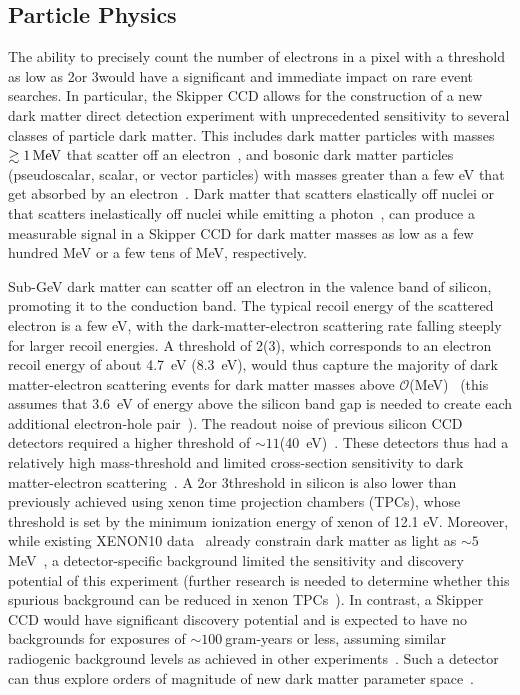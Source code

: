 \documentclass[aps,prl,reprint,superscriptaddress,floatfix,nofootinbib,showkeys,showpacs,preprintnumbers]{revtex4-1}
\begin{document}
\subsection{Particle Physics}

The ability to precisely count the number of electrons in a pixel with a threshold as low as 2\e or 3\e  would have a significant and immediate impact on rare event searches. 
In particular, the Skipper CCD allows for the construction of a new dark matter direct detection experiment with unprecedented sensitivity to several classes of particle dark matter.  
This includes dark matter particles with masses $\gtrsim 1 \mathrm{\,MeV}$ that scatter off an  electron~\cite{Essig:2011nj,Graham:2012su,Lee:2015qva,Essig:2015cda}, and bosonic dark matter particles (pseudoscalar, scalar, or vector particles) with masses greater than a few eV that get absorbed by an electron~\cite{An:2013yua,An:2014twa,Bloch:2016sjj,Hochberg:2016sqx}. 
Dark matter that scatters elastically off nuclei or that scatters inelastically 
off nuclei while emitting a photon~\cite{Kouvaris:2016afs}, can produce a measurable 
signal in a Skipper CCD for dark matter masses as low as a few hundred MeV  or 
a few tens of MeV, respectively.  

Sub-GeV dark matter can scatter off an electron in the valence band of silicon,
promoting it to the conduction band. 
The typical recoil energy of the scattered electron is a few eV, with the dark-matter-electron scattering rate falling steeply for larger recoil energies. A threshold of 2\e (3\e), which corresponds to an electron recoil energy of about 4.7~eV (8.3~eV), would thus capture the majority of dark matter-electron scattering events for dark matter masses above $\mathcal{O}$(MeV)~\cite{Essig:2015cda} (this assumes that 3.6~eV of energy above the silicon band gap is needed to create each additional electron-hole pair~\cite{Klein:1968,ExptGaps}).   
The readout noise of previous silicon CCD detectors required a higher threshold of $\sim 11$\e (40~eV)~\cite{Barreto:2011zu}.
These detectors thus had a relatively high mass-threshold and limited cross-section sensitivity to dark matter-electron scattering~\cite{Essig:2015cda}.  
A 2\e or 3\e threshold in silicon is also lower than previously achieved using xenon time projection chambers (TPCs), whose threshold is set by the minimum ionization energy of xenon of 12.1 eV. 
Moreover, while existing XENON10 data~\cite{Angle:2011th} already constrain dark matter as light as $\sim 5\ $MeV~\cite{Essig:2012yx,Essig:2017kqs}, a detector-specific background limited the sensitivity and discovery potential of this experiment (further research is needed to determine whether this spurious background can be reduced in xenon TPCs~\cite{Sorensen:2017ymt}). 
In contrast, a Skipper CCD  
would have significant discovery potential and is expected to have no backgrounds for exposures of $\sim 100\ $gram-years or less, assuming similar radiogenic background levels as achieved in other experiments~\cite{Agnese:2015nto,Aalseth:2012if,Abgrall:2016tnn,Armengaud:2016aoz}. 
Such a detector can thus explore orders of magnitude of new dark matter parameter space~\cite{Essig:2015cda}.
 
\end{document}
